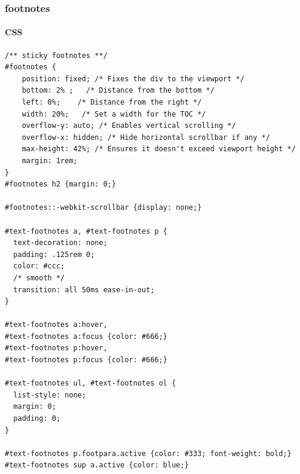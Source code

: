 \documentclass[11pt]{article}
\begin{document}
\subsubsection{footnotes}
\label{sec:orgbbecc63}
\paragraph{CSS}
\label{sec:orgb1ff398}
\begin{verbatim}
/** sticky footnotes **/
#footnotes {
    position: fixed; /* Fixes the div to the viewport */
    bottom: 2% ;   /* Distance from the bottom */
    left: 0%;    /* Distance from the right */
    width: 20%;   /* Set a width for the TOC */
    overflow-y: auto; /* Enables vertical scrolling */
    overflow-x: hidden; /* Hide horizontal scrollbar if any */
    max-height: 42%; /* Ensures it doesn't exceed viewport height */
    margin: 1rem;
}
#footnotes h2 {margin: 0;}

#footnotes::-webkit-scrollbar {display: none;}

#text-footnotes a, #text-footnotes p {
  text-decoration: none;
  padding: .125rem 0;
  color: #ccc;
  /* smooth */
  transition: all 50ms ease-in-out;
}

#text-footnotes a:hover,
#text-footnotes a:focus {color: #666;}
#text-footnotes p:hover,
#text-footnotes p:focus {color: #666;}

#text-footnotes ul, #text-footnotes ol {
  list-style: none;
  margin: 0;
  padding: 0;
}

#text-footnotes p.footpara.active {color: #333; font-weight: bold;}
#text-footnotes sup a.active {color: blue;}
\end{verbatim}
\end{document}
